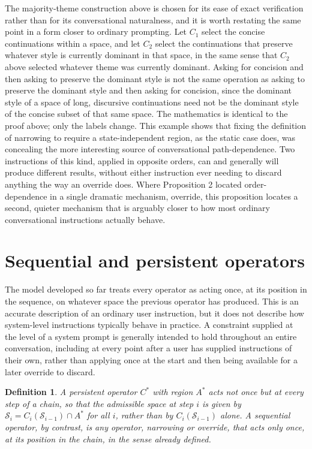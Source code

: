 \documentclass[11pt]{article}
\newtheorem{definition}{Definition}
\begin{document}
The majority-theme construction above is chosen for its ease of exact verification rather than for its conversational naturalness, and it is worth restating the same point in a form closer to ordinary prompting. Let $C_1$ select the concise continuations within a space, and let $C_2$ select the continuations that preserve whatever style is currently dominant in that space, in the same sense that $C_2$ above selected whatever theme was currently dominant. Asking for concision and then asking to preserve the dominant style is not the same operation as asking to preserve the dominant style and then asking for concision, since the dominant style of a space of long, discursive continuations need not be the dominant style of the concise subset of that same space. The mathematics is identical to the proof above; only the labels change. This example shows that fixing the definition of narrowing to require a state-independent region, as the static case does, was concealing the more interesting source of conversational path-dependence. Two instructions of this kind, applied in opposite orders, can and generally will produce different results, without either instruction ever needing to discard anything the way an override does. Where Proposition 2 located order-dependence in a single dramatic mechanism, override, this proposition locates a second, quieter mechanism that is arguably closer to how most ordinary conversational instructions actually behave.

\section{Sequential and persistent operators}

The model developed so far treats every operator as acting once, at its position in the sequence, on whatever space the previous operator has produced. This is an accurate description of an ordinary user instruction, but it does not describe how system-level instructions typically behave in practice. A constraint supplied at the level of a system prompt is generally intended to hold throughout an entire conversation, including at every point after a user has supplied instructions of their own, rather than applying once at the start and then being available for a later override to discard.

\begin{definition}
A \emph{persistent} operator $C^{\ast}$ with region $A^{\ast}$ acts not once but at every step of a chain, so that the admissible space at step $i$ is given by $\mathcal{S}_i = C_i(\mathcal{S}_{i-1}) \cap A^{\ast}$ for all $i$, rather than by $C_i(\mathcal{S}_{i-1})$ alone. A \emph{sequential} operator, by contrast, is any operator, narrowing or override, that acts only once, at its position in the chain, in the sense already defined.
\end{definition}
\end{document}

